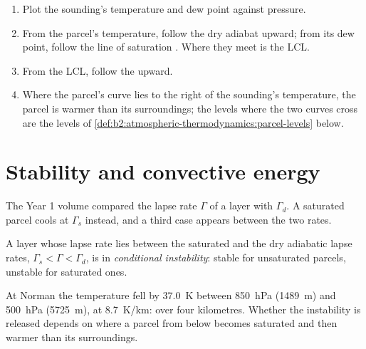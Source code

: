 \begin{method}\label{met:b2:atmospheric-thermodynamics:lift}
\begin{enumerate}
  \item Plot the sounding's temperature and dew point against pressure.
  \item From the parcel's temperature, follow the dry adiabat upward; from its dew point, follow
        the line of saturation . Where they meet is the LCL.
  \item From the LCL, follow the  upward.
  \item Where the parcel's curve lies to the right of the sounding's temperature, the parcel is
        warmer than its surroundings; the levels where the two curves cross are the levels of
        \cref{def:b2:atmospheric-thermodynamics:parcel-levels} below.
\end{enumerate}
\end{method}


\section{Stability and convective energy}\label{sec:b2:atmospheric-thermodynamics:stability}

The Year 1 volume compared the lapse rate $\Gamma$ of a layer with $\Gamma_d$. A saturated
parcel cools at $\Gamma_s$ instead, and a third case appears between the two rates.

\begin{definition}\label{def:b2:atmospheric-thermodynamics:instability}
A layer whose lapse rate lies between the saturated and the dry adiabatic lapse rates,
$\Gamma_s < \Gamma < \Gamma_d$, is in \emph{conditional instability}: stable for unsaturated parcels, unstable for saturated ones.
\end{definition}

At Norman the temperature fell by \qty{37.0}{K} between \qty{850}{hPa} (\qty{1489}{m}) and
\qty{500}{hPa} (\qty{5725}{m}), at \qty{8.7}{K/km}:  over four kilometres.
Whether the instability is released depends on where a parcel from below becomes saturated and
then warmer than its surroundings.

